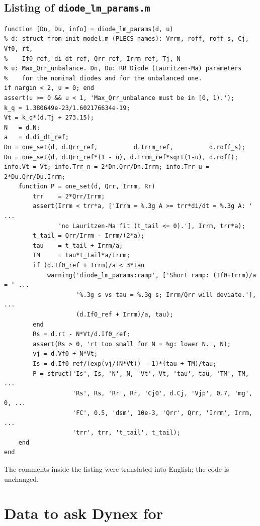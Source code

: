 \documentclass[11pt,a4paper,numbers=noenddot]{scrartcl}
\begin{document}
\begin{onehalfspace}
\subsection{\texorpdfstring{Listing of \texttt{diode\_lm\_params.m}}{Listing of diode\_lm\_params.m}}\label{listing-of-diode_lm_params.m}

{\small\singlespacing\begin{verbatim}
function [Dn, Du, info] = diode_lm_params(d, u)
% d: struct from init_model.m (PLECS names): Vrrm, roff, roff_s, Cj, Vf0, rt,
%    If0_ref, di_dt_ref, Qrr_ref, Irrm_ref, Tj, N
% u: Max_Qrr_unbalance. Dn, Du: RR Diode (Lauritzen-Ma) parameters
%    for the nominal diodes and for the unbalanced one.
if nargin < 2, u = 0; end
assert(u >= 0 && u < 1, 'Max_Qrr_unbalance must be in [0, 1).');
k_q = 1.380649e-23/1.602176634e-19;
Vt = k_q*(d.Tj + 273.15);
N   = d.N;
a   = d.di_dt_ref;
Dn = one_set(d, d.Qrr_ref,          d.Irrm_ref,          d.roff_s);
Du = one_set(d, d.Qrr_ref*(1 - u), d.Irrm_ref*sqrt(1-u), d.roff);
info.Vt = Vt; info.Trr_n = 2*Dn.Qrr/Dn.Irrm; info.Trr_u = 2*Du.Qrr/Du.Irrm;
    function P = one_set(d, Qrr, Irrm, Rr)
        trr    = 2*Qrr/Irrm;
        assert(Irrm < trr*a, ['Irrm = %.3g A >= trr*di/dt = %.3g A: ' ...
               'no Lauritzen-Ma fit (t_tail <= 0).'], Irrm, trr*a);
        t_tail = Qrr/Irrm - Irrm/(2*a);
        tau    = t_tail + Irrm/a;
        TM     = tau*t_tail*a/Irrm;
        if (d.If0_ref + Irrm)/a < 3*tau
            warning('diode_lm_params:ramp', ['Short ramp: (If0+Irrm)/a = ' ...
                    '%.3g s vs tau = %.3g s; Irrm/Qrr will deviate.'], ...
                    (d.If0_ref + Irrm)/a, tau);
        end
        Rs = d.rt - N*Vt/d.If0_ref;
        assert(Rs > 0, 'rt too small for N = %g: lower N.', N);
        vj = d.Vf0 + N*Vt;
        Is = d.If0_ref/(exp(vj/(N*Vt)) - 1)*(tau + TM)/tau;
        P = struct('Is', Is, 'N', N, 'Vt', Vt, 'tau', tau, 'TM', TM, ...
                   'Rs', Rs, 'Rr', Rr, 'Cj0', d.Cj, 'Vjp', 0.7, 'mg', 0, ...
                   'FC', 0.5, 'dsm', 10e-3, 'Qrr', Qrr, 'Irrm', Irrm, ...
                   'trr', trr, 't_tail', t_tail);
    end
end
\end{verbatim}}

\begin{mybox}
The comments inside the listing were translated into English; the code is unchanged.
\end{mybox}

\section{Data to ask Dynex for}\label{data-to-ask-dynex-for}


\end{onehalfspace}
\end{document}
